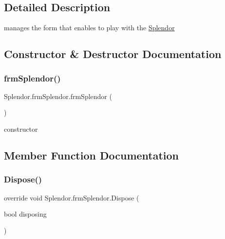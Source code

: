 \subsection{Detailed Description}
manages the form that enables to play with the \mbox{\hyperlink{namespace_splendor}{Splendor}} 



\subsection{Constructor \& Destructor Documentation}
\mbox{\label{class_splendor_1_1frm_splendor_ad9c938893d23192acb1996053e3ea87b}} 
\subsubsection{\texorpdfstring{frm\+Splendor()}{frmSplendor()}}
{\footnotesize\ttfamily Splendor.\+frm\+Splendor.\+frm\+Splendor (\begin{DoxyParamCaption}{ }\end{DoxyParamCaption})}



constructor 



\subsection{Member Function Documentation}
\mbox{\label{class_splendor_1_1frm_splendor_a749f4f1d67c78e74aa1a55aa6fdd754b}} 
\subsubsection{\texorpdfstring{Dispose()}{Dispose()}}
{\footnotesize\ttfamily override void Splendor.\+frm\+Splendor.\+Dispose (\begin{DoxyParamCaption}\item[{bool}]{disposing }\end{DoxyParamCaption})\hspace{0.3cm}{\ttfamily [protected]}}



